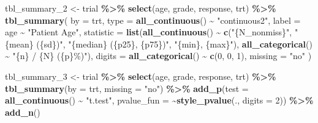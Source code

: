 \documentclass[
]{article}
\newenvironment{Shaded}{\begin{snugshade}}{\end{snugshade}}
\newcommand{\DataTypeTok}[1]{\textcolor[rgb]{0.13,0.29,0.53}{#1}}
\newcommand{\DecValTok}[1]{\textcolor[rgb]{0.00,0.00,0.81}{#1}}
\newcommand{\KeywordTok}[1]{\textcolor[rgb]{0.13,0.29,0.53}{\textbf{#1}}}
\newcommand{\NormalTok}[1]{#1}
\newcommand{\OperatorTok}[1]{\textcolor[rgb]{0.81,0.36,0.00}{\textbf{#1}}}
\newcommand{\StringTok}[1]{\textcolor[rgb]{0.31,0.60,0.02}{#1}}
\begin{document}
\begin{Shaded}
\begin{Highlighting}[]
\NormalTok{tbl\_summary\_}\DecValTok{2}\NormalTok{ <{-}}
\StringTok{  }\NormalTok{trial }\OperatorTok{\%>\%}
\StringTok{  }\KeywordTok{select}\NormalTok{(age, grade, response, trt) }\OperatorTok{\%>\%}
\StringTok{  }\KeywordTok{tbl\_summary}\NormalTok{(}
    \DataTypeTok{by =}\NormalTok{ trt,}
    \DataTypeTok{type =} \KeywordTok{all\_continuous}\NormalTok{() }\OperatorTok{\textasciitilde{}}\StringTok{ "continuous2"}\NormalTok{,}
    \DataTypeTok{label =}\NormalTok{ age }\OperatorTok{\textasciitilde{}}\StringTok{ "Patient Age"}\NormalTok{,}
    \DataTypeTok{statistic =} \KeywordTok{list}\NormalTok{(}\KeywordTok{all\_continuous}\NormalTok{() }\OperatorTok{\textasciitilde{}}\StringTok{ }\KeywordTok{c}\NormalTok{(}\StringTok{"\{N\_nonmiss\}"}\NormalTok{, }
                                          \StringTok{"\{mean\} (\{sd\})"}\NormalTok{, }
                                          \StringTok{"\{median\} (\{p25\}, \{p75\})"}\NormalTok{, }
                                          \StringTok{"\{min\}, \{max\}"}\NormalTok{),}
                     \KeywordTok{all\_categorical}\NormalTok{() }\OperatorTok{\textasciitilde{}}\StringTok{ "\{n\} / \{N\} (\{p\}\%)"}\NormalTok{),}
    \DataTypeTok{digits =} \KeywordTok{all\_categorical}\NormalTok{() }\OperatorTok{\textasciitilde{}}\StringTok{ }\KeywordTok{c}\NormalTok{(}\DecValTok{0}\NormalTok{, }\DecValTok{0}\NormalTok{, }\DecValTok{1}\NormalTok{),}
    \DataTypeTok{missing =} \StringTok{"no"}
\NormalTok{  )}
\end{Highlighting}
\end{Shaded}

\begin{Shaded}
\begin{Highlighting}[]
\NormalTok{tbl\_summary\_}\DecValTok{3}\NormalTok{ <{-}}
\StringTok{  }\NormalTok{trial }\OperatorTok{\%>\%}
\StringTok{  }\KeywordTok{select}\NormalTok{(age, grade, response, trt) }\OperatorTok{\%>\%}
\StringTok{  }\KeywordTok{tbl\_summary}\NormalTok{(}\DataTypeTok{by =}\NormalTok{ trt, }\DataTypeTok{missing =} \StringTok{"no"}\NormalTok{) }\OperatorTok{\%>\%}
\StringTok{  }\KeywordTok{add\_p}\NormalTok{(}\DataTypeTok{test =} \KeywordTok{all\_continuous}\NormalTok{() }\OperatorTok{\textasciitilde{}}\StringTok{ "t.test"}\NormalTok{,}
        \DataTypeTok{pvalue\_fun =} \OperatorTok{\textasciitilde{}}\KeywordTok{style\_pvalue}\NormalTok{(., }\DataTypeTok{digits =} \DecValTok{2}\NormalTok{)) }\OperatorTok{\%>\%}
\StringTok{  }\KeywordTok{add\_n}\NormalTok{()}
\end{Highlighting}
\end{Shaded}
\end{document}
